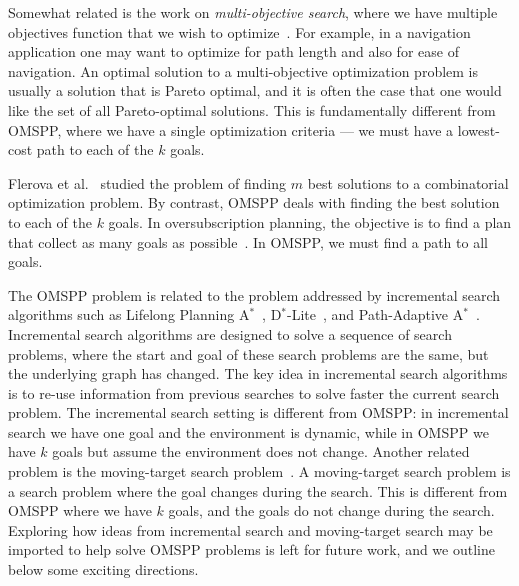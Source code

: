 \documentclass[smallextended]{svjour3}       %
\newcommand{\omspp}{\ac{OMSPP}\xspace}
\newcommand{\astar}{A$^*$\xspace}
\begin{document}
Somewhat related is the work on \emph{multi-objective search}, where we have multiple objectives function that we wish to optimize~\cite{machuca2011analysis}.
For example, in a navigation application one may want to optimize for path length and also for ease of navigation.
An optimal solution to a multi-objective optimization problem is usually a solution that is Pareto optimal, and it is often the case that one would like the set of all Pareto-optimal solutions.
This is fundamentally different from \omspp, where we have a single optimization criteria --- we must have a lowest-cost path to each of the $k$ goals.


Flerova et al.~\cite{flerova2016searching} studied the problem of finding $m$ best solutions to a combinatorial optimization problem. By contrast, \omspp deals with finding the best solution to each of the $k$ goals. 
In oversubscription planning, the objective is to find a plan that collect as many goals as possible~\cite{domshlak2015deterministic}. In \omspp, we must find a path to all goals. 


The \omspp problem is related to the problem addressed by incremental search algorithms such as Lifelong Planning \astar~\cite{koenig2004lifelong}, D$^*$-Lite~\cite{koenig2005fast}, and Path-Adaptive \astar~\cite{hernandez2015reusing}.
Incremental search algorithms are designed to solve a sequence of search problems, where the start and goal of these search problems are the same, but the underlying graph has changed.
The key idea in incremental search algorithms is to re-use information from previous searches to solve faster the current search problem.
The incremental search setting is different from \omspp: in incremental search we have one goal and the environment is dynamic, while in \omspp we have $k$ goals but assume the environment does not change.
Another related problem is the moving-target search problem~\cite{koenig2007speeding,IshidaK1995}.
A moving-target search problem is a search problem where the goal changes during the search.
This is different from \omspp where we have $k$ goals, and the goals do not change during the search.
Exploring how ideas from incremental search and moving-target search may be imported to help solve \omspp problems is left for future work, and we outline below some exciting directions. 
\end{document}
